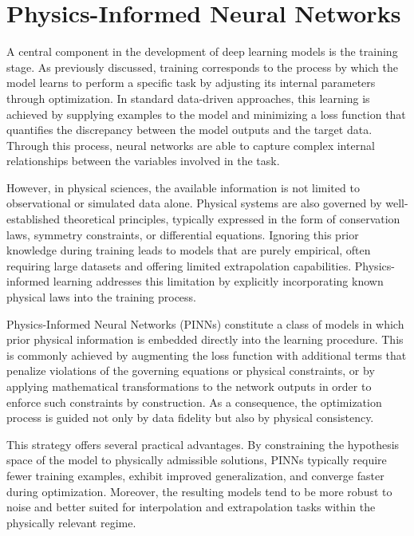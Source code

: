 \section{Physics-Informed Neural Networks}
\label{sec:pinns}

A central component in the development of deep learning models is the training stage. As previously discussed, training corresponds to the process by which the model learns to perform a specific task by adjusting its internal parameters through optimization. In standard data-driven approaches, this learning is achieved by supplying examples to the model and minimizing a loss function that quantifies the discrepancy between the model outputs and the target data. Through this process, neural networks are able to capture complex internal relationships between the variables involved in the task.

However, in physical sciences, the available information is not limited to observational or simulated data alone. Physical systems are also governed by well-established theoretical principles, typically expressed in the form of conservation laws, symmetry constraints, or differential equations. Ignoring this prior knowledge during training leads to models that are purely empirical, often requiring large datasets and offering limited extrapolation capabilities. Physics-informed learning addresses this limitation by explicitly incorporating known physical laws into the training process.

Physics-Informed Neural Networks (PINNs) constitute a class of models in which prior physical information is embedded directly into the learning procedure. This is commonly achieved by augmenting the loss function with additional terms that penalize violations of the governing equations or physical constraints, or by applying mathematical transformations to the network outputs in order to enforce such constraints by construction. As a consequence, the optimization process is guided not only by data fidelity but also by physical consistency.

This strategy offers several practical advantages. By constraining the hypothesis space of the model to physically admissible solutions, PINNs typically require fewer training examples, exhibit improved generalization, and converge faster during optimization. Moreover, the resulting models tend to be more robust to noise and better suited for interpolation and extrapolation tasks within the physically relevant regime.

